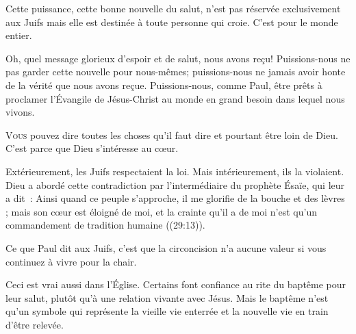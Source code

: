 Cette puissance, cette bonne nouvelle du salut, n'est pas réservée
 exclusivement aux Juifs mais elle est destinée à toute personne qui croie.
 C'est pour le monde entier.

Oh, quel message glorieux d'espoir et de salut, 
 nous avons reçu!  Puissions-nous ne pas garder cette nouvelle
 pour nous-mêmes; puissions-nous ne jamais avoir honte de la vérité
 que nous avons reçue. Puissions-nous, comme Paul, être prêts à proclamer
 l'Évangile  de Jésus-Christ au monde en grand besoin
 dans lequel nous vivons.

\dvrule






\lettrine{V}{ous} pouvez dire toutes les choses qu'il faut dire
 et pourtant être loin de Dieu. C'est parce que Dieu s'intéresse au c\oe{}ur.

Extérieurement, les Juifs respectaient la loi. Mais intérieurement,
 ils la violaient. Dieu a abordé cette contradiction par l'intermédiaire
 du prophète Ésaïe, qui leur a dit~: 
 \og Ainsi quand ce peuple s'approche, il me glorifie de la bouche
 et des lèvres ; mais son cœur est éloigné de moi, et la crainte
 qu'il a de moi n'est qu'un commandement de tradition humaine \fg{}
 ((29:13)). 


Ce que Paul dit aux Juifs, c'est que la circoncision n'a aucune valeur
 si vous continuez à vivre pour la chair.

Ceci est vrai aussi dans l'Église. 
 Certains font confiance au rite du baptême pour leur salut,
 plutôt qu'à une relation vivante avec Jésus.
 Mais le baptême n'est qu'un symbole qui représente la vieille vie
 enterrée et la nouvelle vie en train d'être relevée.

